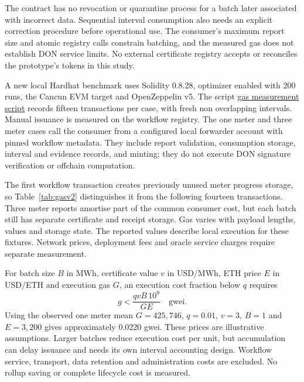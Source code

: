 \documentclass[11pt,a4paper]{article}
\begin{document}
The contract has no revocation or quarantine process for a batch later associated with incorrect data. Sequential interval consumption also needs an explicit correction procedure before operational use. The consumer's maximum report size and atomic registry calls constrain batching, and the measured gas does not establish DON service limits. No external certificate registry accepts or reconciles the prototype's tokens in this study.



A new local Hardhat benchmark uses Solidity 0.8.28, optimizer enabled with 200 runs, the Cancun EVM target and OpenZeppelin v5. The script \href{https://github.com/panagiotisvionis/REC_Dapp_Ethereum/blob/research/recchain-journal-2026-10-26/scripts/gas-journal.js}{gas measurement script} records fifteen transactions per case, with fresh non overlapping intervals. Manual issuance is measured on the workflow registry. The one meter and three meter cases call the consumer from a configured local forwarder account with pinned workflow metadata. They include report validation, consumption storage, interval and evidence records, and minting; they do not execute DON signature verification or offchain computation.



The first workflow transaction creates previously unused meter progress storage, so Table~\ref{tab:gasv2} distinguishes it from the following fourteen transactions. Three meter reports amortise part of the common consumer cost, but each batch still has separate certificate and receipt storage. Gas varies with payload lengths, values and storage state. The reported values describe local execution for these fixtures. Network prices, deployment fees and oracle service charges require separate measurement.



For batch size $B$ in MWh, certificate value $v$ in USD/MWh, ETH price $E$ in USD/ETH and execution gas $G$, an execution cost fraction below $q$ requires
\begin{equation}g < \frac{qvB\,10^9}{GE}\quad\text{gwei}.\label{eq:cost}\end{equation}
Using the observed one meter mean $G=425{,}746$, $q=0.01$, $v=3$, $B=1$ and $E=3{,}200$ gives approximately 0.0220 gwei. These prices are illustrative assumptions. Larger batches reduce execution cost per unit, but accumulation can delay issuance and needs its own interval accounting design. Workflow service, transport, data retention and administration costs are excluded. No rollup saving or complete lifecycle cost is measured.
\end{document}
